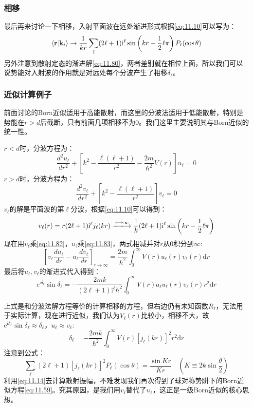 \documentclass[a4paper,zihao=-4,linespread=1]{ctexrep}
\begin{document}
	\subsubsection{相移}
	最后再来讨论一下相移，入射平面波在远处渐进形式根据\ref{eq:11.10}可以写为：
	\[\braket{\mathbf{r}|\mathbf{k}_i}\to\frac{1}{kr}\sum_\ell(2\ell+1)\mathrm{i}^\ell\sin\left(kr-\frac{1}{2}\ell\pi\right)P_\ell(\cos\theta)\]
	另外注意到散射定态的渐进解\ref{eq:11.80}，两者差别就在相位上面，所以我们可以说势能对入射波的作用就是对远处每个分波产生了相移$\delta_\ell$。
	\subsubsection{近似计算例子}
	前面讨论的Born近似适用于高能散射，而这里的分波法适用于低能散射，特别是势能在$r>d$后截断，只有前面几项相移不为$0$。我们这里主要说明其与Born近似的统一性。
	
	$r<d$时，分波方程为：
	\begin{equation}
		\label{eq:11.82}
		\frac{d^2u_\ell}{dr^2}+\left[k^2-\frac{\ell(\ell+1)}{r^2}-\frac{2m}{\hbar^2}V(r)\right]u_\ell=0
	\end{equation}
		$r>d$时，分波方程为：
	\begin{equation}
		\label{eq:11.83}
		\frac{d^2v_\ell}{dr^2}+\left[k^2-\frac{\ell(\ell+1)}{r^2}\right]v_\ell=0
	\end{equation}
	$v_\ell$的解是平面波的第$\ell$分波，根据\ref{eq:11.10}可以得到：
	\[v_\ell(r)=r(2\ell+1)\mathrm{i}^\ell j_\ell(kr)\xlongrightarrow{r\to\infty}\frac{1}{k}(2\ell+1)\mathrm{i}^\ell\sin\left(kr-\frac{1}{2}\ell\pi\right)\]
	现在用$v_\ell$乘\ref{eq:11.82}，$u_\ell$乘\ref{eq:11.83}，两式相减并对$r$从$0$积分到$\infty$:
	\[\left[v_\ell\frac{du_\ell}{dr}-u_\ell\frac{dv_\ell}{dr}\right]_{r\to\infty}=\frac{2m}{\hbar^2}\int_0^\infty V(r) u_\ell(r)v_\ell(r)\mathrm{d}r\]
	最后将$u_\ell,v_\ell$的渐进式代入得到：
	\begin{equation}
		\mathrm{e}^{\mathrm{i}\delta_\ell}\sin\delta_\ell=-\frac{2mk}{(2\ell+1)\mathrm{i}^\ell\hbar^2}\int_0^\infty V(r)a_\ell u_\ell(r)v_\ell(r)r^2\mathrm{d}r
	\end{equation}
	
	上式是和分波法解方程等价的计算相移的方程，但右边仍有未知函数$R_\ell$，无法用于实际计算，现在进行近似，我们认为$V_\ell(r)$比较小，相移不大，故$\mathrm{e}^{\mathrm{i}\delta_\ell}\sin\delta_\ell\approx \delta_\ell$，$u_\ell\approx v_\ell$:
	\begin{equation}
		\label{eq:11.85}
		\delta_\ell=-\frac{2mk}{\hbar^2}\int_0^\infty V(r) \left[j_\ell(kr)\right]^2r^2\mathrm{d}r
	\end{equation}
	注意到公式：
	\[\sum_\ell(2\ell+1)\left[j_\ell(kr)\right]^2P_\ell(\cos\theta)=\frac{\sin Kr}{Kr}\quad(K\equiv2k\sin\frac{\theta}{2})\]
	利用\ref{eq:11.14}去计算散射振幅，不难发现我们再次得到了球对称势阱下的Born近似方程\ref{eq:11.59}。究其原因，是我们用$v_\ell$替代了$u_\ell$，这正是一级Born近似的核心思想。
	
\end{document}
